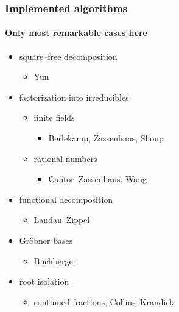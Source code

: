 \documentclass[10pt,polish]{beamer}
\begin{document}
\begin{frame}
    \frametitle{Implemented algorithms}
    \framesubtitle{Only most remarkable cases here}

    \begin{itemize}
        \item square--free decomposition
            \begin{itemize}
                \item Yun
            \end{itemize}
        \item factorization into irreducibles
            \begin{itemize}
                \item finite fields
                    \begin{itemize}
                        \item Berlekamp, Zassenhaus, Shoup
                    \end{itemize}
                \item rational numbers
                    \begin{itemize}
                        \item Cantor--Zassenhaus, Wang
                    \end{itemize}
            \end{itemize}
        \item functional decomposition
            \begin{itemize}
                \item Landau--Zippel
            \end{itemize}
        \item Gr\"{o}bner bases
            \begin{itemize}
                \item Buchberger
            \end{itemize}
        \item root isolation
            \begin{itemize}
                \item continued fractions, Collins--Krandick
            \end{itemize}
    \end{itemize}
\end{frame}
\end{document}
